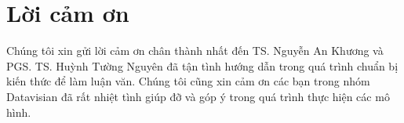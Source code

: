 \chapter*{Lời cảm ơn}
Chúng tôi xin gửi lời cảm ơn chân thành nhất đến TS. Nguyễn An Khương và PGS. TS. Huỳnh Tường Nguyên đã tận tình hướng dẫn trong quá trình chuẩn bị kiến thức để làm luận văn. Chúng tôi cũng xin cảm ơn các bạn trong nhóm Datavisian đã rất nhiệt tình giúp đỡ và góp ý trong quá trình thực hiện các mô hình.
